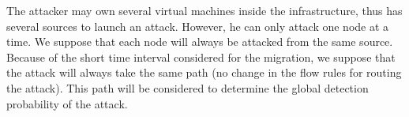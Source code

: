 The attacker may own several virtual machines inside the infrastructure, thus has several sources to launch an attack. However, he can only attack one node at a time. 
We suppose that each node will always be attacked from the same source. 
Because of the short time interval considered for the migration, we suppose that the attack will always take the same path (\ie no change in the flow rules for routing the attack). 
This path will be considered to determine the global detection probability of the attack.
